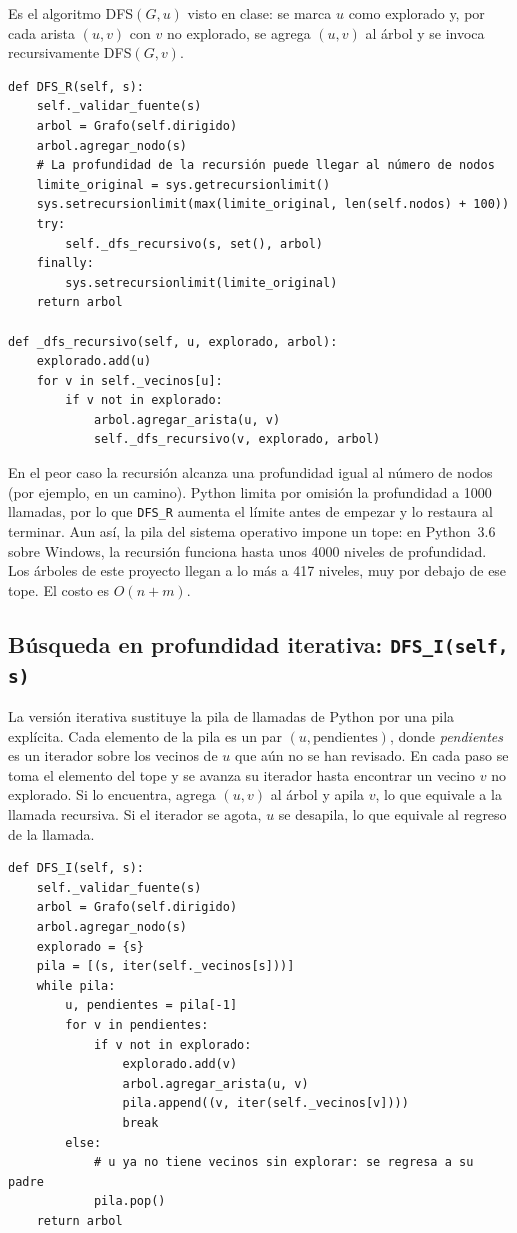 \documentclass[11pt,letterpaper]{article}
\begin{document}
Es el algoritmo DFS$(G, u)$ visto en clase: se marca $u$ como explorado y, por cada
arista $(u, v)$ con $v$ no explorado, se agrega $(u, v)$ al árbol y se invoca
recursivamente DFS$(G, v)$.

\begin{lstlisting}[caption={Métodos \texttt{DFS\_R} y \texttt{\_dfs\_recursivo}.}]
def DFS_R(self, s):
    self._validar_fuente(s)
    arbol = Grafo(self.dirigido)
    arbol.agregar_nodo(s)
    # La profundidad de la recursión puede llegar al número de nodos
    limite_original = sys.getrecursionlimit()
    sys.setrecursionlimit(max(limite_original, len(self.nodos) + 100))
    try:
        self._dfs_recursivo(s, set(), arbol)
    finally:
        sys.setrecursionlimit(limite_original)
    return arbol

def _dfs_recursivo(self, u, explorado, arbol):
    explorado.add(u)
    for v in self._vecinos[u]:
        if v not in explorado:
            arbol.agregar_arista(u, v)
            self._dfs_recursivo(v, explorado, arbol)
\end{lstlisting}

En el peor caso la recursión alcanza una profundidad igual al número de nodos (por
ejemplo, en un camino). Python limita por omisión la profundidad a 1000 llamadas,
por lo que \texttt{DFS\_R} aumenta el límite antes de empezar y lo restaura al
terminar. Aun así, la pila del sistema operativo impone un tope: en Python~3.6
sobre Windows, la recursión funciona hasta unos 4000 niveles de profundidad. Los
árboles de este proyecto llegan a lo más a 417 niveles, muy por debajo de ese tope.
El costo es $O(n + m)$.

\subsection{Búsqueda en profundidad iterativa: \texttt{DFS\_I(self, s)}}

La versión iterativa sustituye la pila de llamadas de Python por una pila
explícita. Cada elemento de la pila es un par $(u, \text{pendientes})$, donde
\emph{pendientes} es un iterador sobre los vecinos de $u$ que aún no se han
revisado. En cada paso se toma el elemento del tope y se avanza su iterador hasta
encontrar un vecino $v$ no explorado. Si lo encuentra, agrega $(u, v)$ al árbol y
apila $v$, lo que equivale a la llamada recursiva. Si el iterador se agota, $u$ se
desapila, lo que equivale al regreso de la llamada.

\begin{lstlisting}[caption={Método \texttt{DFS\_I}.}]
def DFS_I(self, s):
    self._validar_fuente(s)
    arbol = Grafo(self.dirigido)
    arbol.agregar_nodo(s)
    explorado = {s}
    pila = [(s, iter(self._vecinos[s]))]
    while pila:
        u, pendientes = pila[-1]
        for v in pendientes:
            if v not in explorado:
                explorado.add(v)
                arbol.agregar_arista(u, v)
                pila.append((v, iter(self._vecinos[v])))
                break
        else:
            # u ya no tiene vecinos sin explorar: se regresa a su padre
            pila.pop()
    return arbol
\end{lstlisting}
\end{document}
